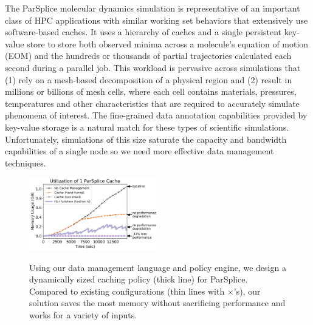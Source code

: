 The ParSplice molecular dynamics simulation is representative of an important
class of HPC applications with similar working set behaviors that extensively
use software-based caches. It uses a hierarchy of caches and a single
persistent key-value store to store both observed minima across a molecule's
equation of motion (EOM) and the hundreds or thousands of partial trajectories
calculated each second during a parallel job.  This workload is pervasive
across simulations that (1) rely on a mesh-based decomposition of a physical
region and (2) result in millions or billions of mesh cells, where each cell
contains materials, pressures, temperatures and other characteristics that are
required to accurately simulate phenomena of interest.  The fine-grained data
annotation capabilities provided by key-value storage is a natural match for
these types of scientific simulations.  Unfortunately, simulations of this size
saturate the capacity and bandwidth capabilities of a single node so we need
more effective data management techniques.

\begin{figure}[t]
\noindent\includegraphics[width=0.5\textwidth]{figures/cache-management.png}\\
\caption{Using our data management language and policy engine, we design a
dynamically sized caching policy (thick line) for ParSplice.  Compared to
existing configurations (thin lines with \(\times\)'s), our solution saves the most
memory without sacrificing performance and works for a variety of inputs.
\label{fig:cache-management}}
\end{figure}

